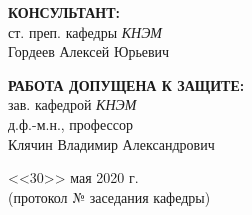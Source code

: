 \begin{center}
\vspace{0pt plus1fill} %

\hfill\begin{minipage}{0.55\textwidth}
			\textbf{КОНСУЛЬТАНТ:} \\
			ст. преп. кафедры \textit{КНЭМ} \\
			Гордеев Алексей Юрьевич \\
			\underline{\hspace{\textwidth}}
		\end{minipage}
%

\vspace{0pt plus1fill} %

\hfill\begin{minipage}{0.55\textwidth}
			\textbf{РАБОТА ДОПУЩЕНА К ЗАЩИТЕ:} \\
			зав. кафедрой \textit{КНЭМ} \\
			д.ф.-м.н., профессор \\
			Клячин Владимир Александрович \\
			\underline{\hspace{\textwidth}}
		\end{minipage}
%

\hfill\begin{minipage}{0.55\textwidth}
			<<30>> мая 2020 г. \\
			(протокол № \underline{\hspace{1cm}} заседания кафедры)
		\end{minipage}
%

\vspace{0pt plus4fill} %
\end{center}
%
{\centering\textbf{\thesisCity}\  \textbf{\thesisYear}\par}
